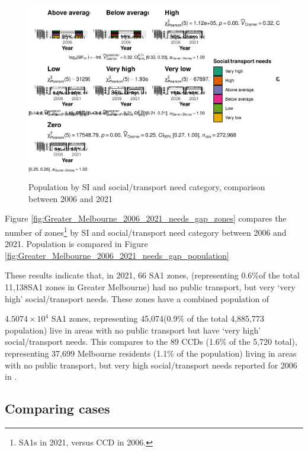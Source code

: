 \documentclass[preprint, 3p,
authoryear]{elsarticle} %
\begin{document}
\begin{figure}
\centering
\includegraphics{Leveraging_GTFS_to_assess_transit_supply_Transport_Geography_files/figure-latex/Greater_Melbourne_2006_2021_needs_gap_population-1.pdf}
\caption{Population by SI and social/transport need category, comparison
between 2006 and 2021}
\end{figure}

Figure \ref{fig:Greater_Melbourne_2006_2021_needs_gap_zones} compares
the number of zones\footnote{SA1s in 2021, versus CCD in 2006.} by SI
and social/transport need category between 2006 and 2021. Population is
compared in Figure
\ref{fig:Greater_Melbourne_2006_2021_needs_gap_population}

These results indicate that, in 2021, 66 SA1 zones, (representing
0.6\%of the total 11,138SA1 zones in Greater Melbourne) had no public
transport, but very `very high' social/transport needs. These zones have
a combined population of

\ensuremath{4.5074\times 10^{4}} SA1 zones, representing 45,074(0.9\% of
the total 4,885,773 population) live in areas with no public transport
but have `very high' social/transport needs. This compares to the 89
CCDs (1.6\% of the 5,720 total), representing 37,699 Melbourne residents
(1.1\% of the population) living in areas with no public transport, but
very high social/transport needs reported for 2006 in
\citet{currie2010identifying}.

\subsection{Comparing cases}\label{comparing-cases}
\end{document}
